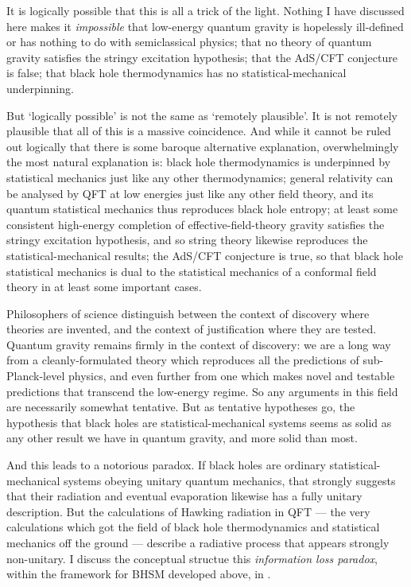\documentclass{article}
\begin{document}
It is logically possible that this is all a trick of the light. Nothing I have discussed here makes it \emph{impossible} that low-energy quantum gravity is hopelessly ill-defined or has nothing to do with semiclassical physics; that no theory of quantum gravity satisfies the stringy excitation hypothesis; that the AdS/CFT conjecture is false; that black hole thermodynamics has no statistical-mechanical underpinning. 

But `logically possible' is not the same as `remotely plausible'. It is not remotely plausible that all of this is a massive coincidence. And while it cannot be ruled out logically that there is some baroque alternative explanation, overwhelmingly the most natural explanation is: black hole thermodynamics is underpinned by statistical mechanics just like any other thermodynamics; general relativity can be analysed by QFT at low energies just like any other field theory, and its quantum statistical mechanics thus reproduces black hole entropy; at least some consistent high-energy completion of effective-field-theory gravity satisfies the stringy excitation hypothesis, and so string theory likewise reproduces the statistical-mechanical results; the AdS/CFT conjecture is true, so that black hole statistical mechanics is dual to the statistical mechanics of a conformal field theory in at least some important cases.

Philosophers of science distinguish between the context of discovery where theories are invented, and the context of justification where they are tested. Quantum gravity remains firmly in the context of discovery: we are a long way from a cleanly-formulated theory which reproduces all the predictions of sub-Planck-level physics, and even further from one which makes novel and testable predictions that transcend the low-energy regime. So any arguments in this field are necessarily somewhat tentative. But as tentative hypotheses go, the hypothesis that black holes are statistical-mechanical systems seems as solid as any other result we have in quantum gravity, and more solid than most. 

And this leads to a notorious paradox. If black holes are ordinary statistical-mechanical systems obeying unitary quantum mechanics, that strongly suggests that their radiation and eventual evaporation likewise has a fully unitary description. But the calculations of Hawking radiation in QFT --- the very calculations which got the field of black hole thermodynamics and statistical mechanics off the ground --- describe a radiative process that appears strongly non-unitary. I discuss the conceptual structue this \emph{information loss paradox}, within the framework for BHSM developed above, in .
\end{document}
